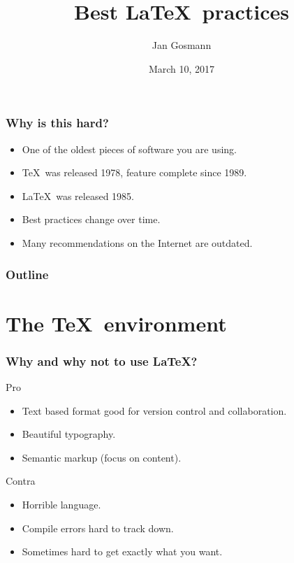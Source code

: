 \documentclass[aspectratio=1610,hyperref={colorlinks,linkcolor=}]{beamer}
\title{Best \LaTeX\ practices}
\author{Jan Gosmann}
\date{March 10, 2017}
\begin{document}
\maketitle

\begin{frame}
    \frametitle{Why is this hard?}
    \begin{itemize}
        \item One of the oldest pieces of software you are using.
        \item \TeX\ was released 1978, feature complete since 1989.
        \item \LaTeX\ was released 1985.
        \item Best practices change over time.
        \item Many recommendations on the Internet are outdated.
    \end{itemize}
\end{frame}


\begin{frame}
    \frametitle{Outline}
    \tableofcontents
\end{frame}

\section{The \TeX\ environment}
\begin{frame}
    \frametitle{Why and why not to use \LaTeX?}
    \begin{block}{Pro}
        \begin{itemize}
            \item Text based format good for version control and collaboration.
            \item Beautiful typography.
            \item Semantic markup (focus on content).
        \end{itemize}
    \end{block}
    \begin{block}{Contra}
        \begin{itemize}
            \item Horrible language.
            \item Compile errors hard to track down.
            \item Sometimes hard to get exactly what you want.
        \end{itemize}
    \end{block}
\end{frame}
\end{document}

